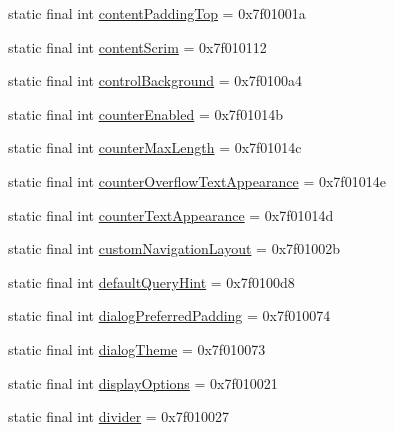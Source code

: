 \begin{CompactItemize}
\item 
static final int \hyperlink{classandroid_1_1support_1_1v7_1_1cardview_1_1_r_1_1attr_c1fadfe0af3497bd8a8c35e8c60f83bd}{contentPaddingTop} = 0x7f01001a
\item 
static final int \hyperlink{classandroid_1_1support_1_1v7_1_1cardview_1_1_r_1_1attr_d652db52ccc48f7a705be533384f3045}{contentScrim} = 0x7f010112
\item 
static final int \hyperlink{classandroid_1_1support_1_1v7_1_1cardview_1_1_r_1_1attr_cc06a9a99f29e5659ac1808aeaaa07da}{controlBackground} = 0x7f0100a4
\item 
static final int \hyperlink{classandroid_1_1support_1_1v7_1_1cardview_1_1_r_1_1attr_03636b0317dfbf55f7eea87606e87683}{counterEnabled} = 0x7f01014b
\item 
static final int \hyperlink{classandroid_1_1support_1_1v7_1_1cardview_1_1_r_1_1attr_4f9c3b0cb3e6ffef8fb4854c85920688}{counterMaxLength} = 0x7f01014c
\item 
static final int \hyperlink{classandroid_1_1support_1_1v7_1_1cardview_1_1_r_1_1attr_3e9737c620c866ccd7654195558e9d47}{counterOverflowTextAppearance} = 0x7f01014e
\item 
static final int \hyperlink{classandroid_1_1support_1_1v7_1_1cardview_1_1_r_1_1attr_ceb3035cb8b908d8d59cf468fc521fff}{counterTextAppearance} = 0x7f01014d
\item 
static final int \hyperlink{classandroid_1_1support_1_1v7_1_1cardview_1_1_r_1_1attr_ae10e3832af77e4ab3a5337cb4945501}{customNavigationLayout} = 0x7f01002b
\item 
static final int \hyperlink{classandroid_1_1support_1_1v7_1_1cardview_1_1_r_1_1attr_900541a2ff6d97c6835149232ff9088a}{defaultQueryHint} = 0x7f0100d8
\item 
static final int \hyperlink{classandroid_1_1support_1_1v7_1_1cardview_1_1_r_1_1attr_f46a4764b24319ac6006805a0b84a117}{dialogPreferredPadding} = 0x7f010074
\item 
static final int \hyperlink{classandroid_1_1support_1_1v7_1_1cardview_1_1_r_1_1attr_9ae1b8bafd56f7b03842b3c0c4b2777a}{dialogTheme} = 0x7f010073
\item 
static final int \hyperlink{classandroid_1_1support_1_1v7_1_1cardview_1_1_r_1_1attr_2f7365a8ace079fceeaf1985fdf19c5b}{displayOptions} = 0x7f010021
\item 
static final int \hyperlink{classandroid_1_1support_1_1v7_1_1cardview_1_1_r_1_1attr_a48d93b3f1c408433f07ffcf19f4b530}{divider} = 0x7f010027
\item 

\end{CompactItemize}
